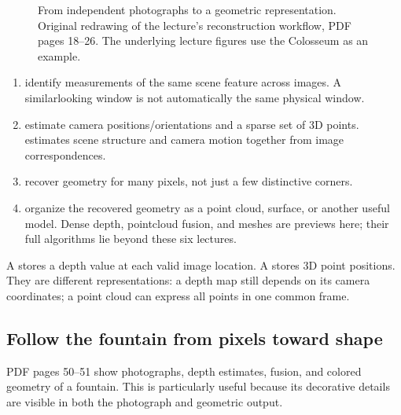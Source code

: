 \documentclass[letterpaper,11pt,english,openany,oneside]{jupyterBook}
\begin{document}
\begin{figure}[H]
\centering
\capstart

\noindent{}
\caption{From independent photographs to a geometric representation. Original redrawing of the lecture’s reconstruction workflow, PDF pages 18–26. The underlying lecture figures use the Colosseum as an example.}\label{\detokenize{lectures/lecture01/motivation:fig-lec01-pipeline}}\end{figure}
\begin{enumerate}
%
\item {}
\sphinxAtStartPar
{} identify measurements of the same scene feature across images. A similar\sphinxhyphen{}looking window is not automatically the same physical window.

\item {}
\sphinxAtStartPar
{} estimate camera positions/orientations and a sparse set of 3D points.  estimates scene structure and camera motion together from image correspondences.

\item {}
\sphinxAtStartPar
{} recover geometry for many pixels, not just a few distinctive corners.

\item {}
\sphinxAtStartPar
{} organize the recovered geometry as a point cloud, surface, or another useful model. Dense depth, point\sphinxhyphen{}cloud fusion, and meshes are previews here; their full algorithms lie beyond these six lectures.

\end{enumerate}

\sphinxAtStartPar
A  stores a depth value at each valid image location. A  stores 3D point positions. They are different representations: a depth map still depends on its camera coordinates; a point cloud can express all points in one common frame.


\subsection{Follow the fountain from pixels toward shape}
\label{\detokenize{lectures/lecture01/motivation:follow-the-fountain-from-pixels-toward-shape}}
\sphinxAtStartPar
PDF pages 50–51 show photographs, depth estimates, fusion, and colored geometry of a fountain. This is particularly useful because its decorative details are visible in both the photograph and geometric output.
\end{document}
